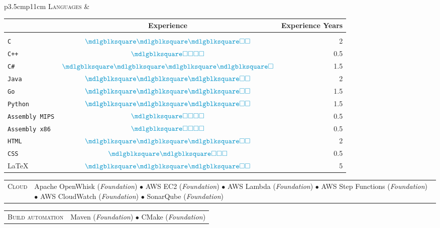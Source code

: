 \documentclass[english,10pt,a4paper]{article}
\newcommand{\BasicLevel}{{\footnotesize (\textit{Foundation})}}
\newcommand{\CvBullet}{\hspace{0.05cm} \textcolor{CvColor}{$\bullet$} \hspace{0.05cm}}
\newcommand{\CvDate}[1]{\textcolor{CvColor}{{\textsc{#1}}}}
\newcommand{\FullBlock}{\textcolor{CvColor}{\mdlgblksquare}}
\newcommand{\EmptyBlock}{\textcolor{CvColor}{\square}}
\def\SidebarHSize{3.5cm}
\def\BodyHSize{11cm}
\begin{document}
	\begin{longtable}{p{\SidebarHSize}p{\BodyHSize}}
		\CvDate{Languages} &  \begin{tabular}{lcr}
			\centering
			& \textbf{Experience} & \textbf{Experience Years} \\
			\hline
			&& \\
			\texttt{C} & $\FullBlock\FullBlock\FullBlock\EmptyBlock\EmptyBlock$ & 2 \\
			\texttt{C++} & $\FullBlock\EmptyBlock\EmptyBlock\EmptyBlock\EmptyBlock$ & 0.5 \\
			\texttt{C\#} & $\FullBlock\FullBlock\FullBlock\FullBlock\EmptyBlock$ & 1.5 \\
			\texttt{Java} & $\FullBlock\FullBlock\FullBlock\EmptyBlock\EmptyBlock$ & 2 \\
			\texttt{Go} & $\FullBlock\FullBlock\FullBlock\EmptyBlock\EmptyBlock$ & 1.5 \\
			\texttt{Python} & $\FullBlock\FullBlock\FullBlock\EmptyBlock\EmptyBlock$ & 1.5 \\
			\texttt{Assembly MIPS} & $\FullBlock\EmptyBlock\EmptyBlock\EmptyBlock\EmptyBlock$ & 0.5 \\
			\texttt{Assembly x86} & $\FullBlock\EmptyBlock\EmptyBlock\EmptyBlock\EmptyBlock$ & 0.5 \\
			\texttt{HTML} & $\FullBlock\FullBlock\FullBlock\EmptyBlock\EmptyBlock$ & 2 \\
			\texttt{CSS} & $\FullBlock\FullBlock\EmptyBlock\EmptyBlock\EmptyBlock$ & 0.5 \\
			\LaTeX & $\FullBlock\FullBlock\FullBlock\EmptyBlock\EmptyBlock$ & 5 \\
		\end{tabular}
	\end{longtable}
	
	
	\begin{longtable}{p{\SidebarHSize}p{\BodyHSize}}
		\CvDate{Cloud} & Apache OpenWhisk \BasicLevel \CvBullet AWS EC2 \BasicLevel \CvBullet AWS Lambda  \BasicLevel \CvBullet AWS Step Functions \BasicLevel \CvBullet AWS CloudWatch \BasicLevel \CvBullet SonarQube \BasicLevel
	\end{longtable}
		
	\begin{longtable}{p{\SidebarHSize}p{\BodyHSize}}
		\CvDate{Build automation} & Maven \BasicLevel \CvBullet CMake \BasicLevel
	\end{longtable}
		
\end{document}
